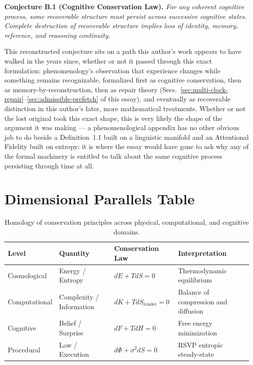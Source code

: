\documentclass[12pt,a4paper]{article}
\theoremstyle{plain}
\theoremstyle{definition}
\theoremstyle{remark}
\newcommand{\Phifield}{\Phi}
\newcommand{\Sfield}{S}
\begin{document}
\bigskip
\noindent\textbf{Conjecture B.1 (Cognitive Conservation Law).} \emph{For any coherent cognitive process, some recoverable structure must persist across successive cognitive states. Complete destruction of recoverable structure implies loss of identity, memory, reference, and reasoning continuity.}
\bigskip

This reconstructed conjecture sits on a path this author's work appears to have walked in the years since, whether or not it passed through this exact formulation: phenomenology's observation that experience changes while something remains recognizable, formalized first as cognitive conservation, then as memory-by-reconstruction, then as repair theory (Secs.~\ref{sec:multi-clock-repair}--\ref{sec:admissible-prefetch} of this essay), and eventually as recoverable distinction in this author's later, more mathematical treatments. Whether or not the lost original took this exact shape, this is very likely the shape of the argument it was making — a phenomenological appendix has no other obvious job to do beside a Definition~1.1 built on a linguistic manifold and an Attentional Fidelity built on entropy: it is where the essay would have gone to ask why any of the formal machinery is entitled to talk about the same cognitive process persisting through time at all.

\section{Dimensional Parallels Table}
\begin{table}[H]
\centering
\renewcommand{\arraystretch}{1.2}
\begin{tabular}{@{}llll@{}}
\toprule
\textbf{Level} & \textbf{Quantity} & \textbf{Conservation Law} & \textbf{Interpretation} \\
\midrule
Cosmological & Energy / Entropy & $dE + TdS = 0$ & Thermodynamic equilibrium \\
Computational & Complexity / Information & $dK + Td\Sfield_{\text{render}} = 0$ & Balance of compression and diffusion \\
Cognitive & Belief / Surprise & $dF + TdH = 0$ & Free energy minimization \\
Procedural & Law / Execution & $d\Phifield + \sigma^2 d\Sfield = 0$ & RSVP entropic steady-state \\
\bottomrule
\end{tabular}
\caption{Homology of conservation principles across physical, computational, and cognitive domains.}
\label{tab:dimensional-parallels}
\end{table}
\end{document}
